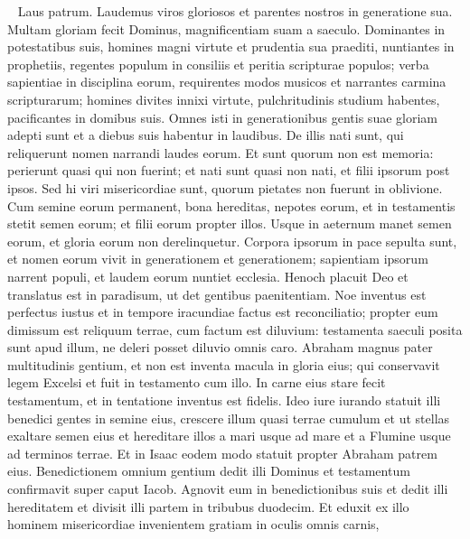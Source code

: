 \begin{biblechapter}    
\verse Laus patrum. Laudemus viros gloriosos et parentes nostros in generatione sua. 
\verse Multam gloriam fecit Dominus, magnificentiam suam a saeculo. 
\verse Dominantes in potestatibus suis, homines magni virtute et prudentia sua praediti, nuntiantes in prophetiis, 
\verse regentes populum in consiliis et peritia scripturae populos; verba sapientiae in disciplina eorum, 
\verse requirentes modos musicos et narrantes carmina scripturarum; 
\verse homines divites innixi virtute, pulchritudinis studium habentes, pacificantes in domibus suis. 
\verse Omnes isti in generationibus gentis suae gloriam adepti sunt et a diebus suis habentur in laudibus. 
\verse De illis nati sunt, qui reliquerunt nomen narrandi laudes eorum. 
\verse Et sunt quorum non est memoria: perierunt quasi qui non fuerint; et nati sunt quasi non nati, et filii ipsorum post ipsos. 
\verse Sed hi viri misericordiae sunt, quorum pietates non fuerunt in oblivione. 
\verse Cum semine eorum permanent, bona hereditas, nepotes eorum, 
\verse et in testamentis stetit semen eorum; 
\verse et filii eorum propter illos. Usque in aeternum manet semen eorum, et gloria eorum non derelinquetur. 
\verse Corpora ipsorum in pace sepulta sunt, et nomen eorum vivit in generationem et generationem; 
\verse sapientiam ipsorum narrent populi, et laudem eorum nuntiet ecclesia. 
\verse Henoch placuit Deo et translatus est in paradisum, ut det gentibus paenitentiam. 
\verse Noe inventus est perfectus iustus et in tempore iracundiae factus est reconciliatio; 
\verse propter eum dimissum est reliquum terrae, cum factum est diluvium: 
\verse testamenta saeculi posita sunt apud illum, ne deleri posset diluvio omnis caro. 
\verse Abraham magnus pater multitudinis gentium, et non est inventa macula in gloria eius; qui conservavit legem Excelsi et fuit in testamento cum illo. 
\verse In carne eius stare fecit testamentum, et in tentatione inventus est fidelis. 
\verse Ideo iure iurando statuit illi benedici gentes in semine eius, crescere illum quasi terrae cumulum 
\verse et ut stellas exaltare semen eius et hereditare illos a mari usque ad mare et a Flumine usque ad terminos terrae. 
\verse Et in Isaac eodem modo statuit propter Abraham patrem eius. 
\verse Benedictionem omnium gentium dedit illi Dominus et testamentum confirmavit super caput Iacob. 
\verse Agnovit eum in benedictionibus suis et dedit illi hereditatem et divisit illi partem in tribubus duodecim. 
\verse Et eduxit ex illo hominem misericordiae invenientem gratiam in oculis omnis carnis, 
\end{biblechapter}

